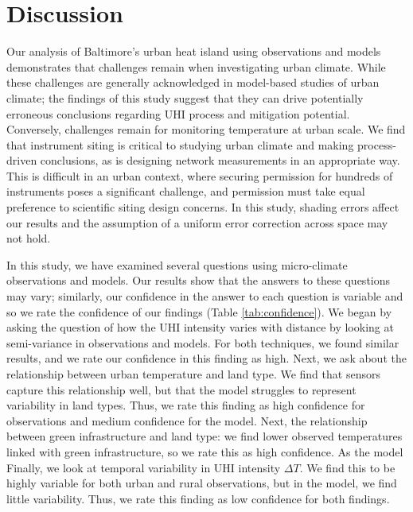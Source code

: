 \section{Discussion}
Our analysis of Baltimore's urban heat island using observations and models demonstrates that challenges remain when investigating urban climate. 
While these challenges are generally acknowledged in model-based studies of urban climate; the findings of this study suggest that they can drive potentially erroneous conclusions regarding UHI process and mitigation potential. 
Conversely, challenges remain for monitoring temperature at urban scale. We find that instrument siting is critical to studying urban climate and making process-driven conclusions, as is designing network measurements in an appropriate way. 
This is difficult in an urban context, where securing permission for hundreds of instruments poses a significant challenge, and permission must take equal preference to scientific siting design concerns. 
In this study, shading errors affect our results and the assumption of a uniform error correction across space may not hold. 

In this study, we have examined several questions using micro-climate observations and models. Our results show that the answers to these questions may vary; similarly, our confidence in the answer to each question is variable and so we rate the confidence of our findings (Table \ref{tab:confidence}). We began by asking the question of 
how the UHI intensity varies with distance by looking at semi-variance in observations and models. For both techniques, we found similar results, and we rate our confidence in this finding as high. 
Next, we ask about the relationship between urban temperature and land type. We find that sensors capture this relationship well, but that the model struggles to represent variability in land types. 
Thus, we rate this finding as high confidence for observations and medium confidence for the model. 
Next, the relationship between green infrastructure and land type: we find lower observed temperatures linked with green infrastructure, so we rate this as high confidence. As the model  
Finally, we look at temporal variability in UHI intensity $\Delta T$. We find this to be highly variable for both urban and rural observations, but in the model, we find little variability. Thus, we rate this finding as low confidence for both findings. 

